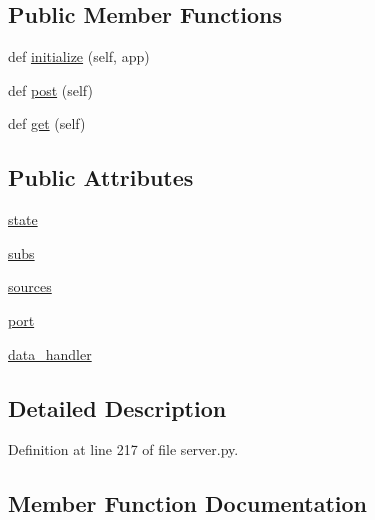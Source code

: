 \subsection*{Public Member Functions}
\begin{DoxyCompactItemize}
\item 
def \hyperlink{classparlai_1_1mturk_1_1webapp_1_1server_1_1RunListHandler_aea5350b7ea1536cacfc3dfff4ffe1f32}{initialize} (self, app)
\item 
def \hyperlink{classparlai_1_1mturk_1_1webapp_1_1server_1_1RunListHandler_a7ecee21fd9a47687af7466e502bba574}{post} (self)
\item 
def \hyperlink{classparlai_1_1mturk_1_1webapp_1_1server_1_1RunListHandler_a66e2a62b37bbcc83c70b25bbbbd64952}{get} (self)
\end{DoxyCompactItemize}
\subsection*{Public Attributes}
\begin{DoxyCompactItemize}
\item 
\hyperlink{classparlai_1_1mturk_1_1webapp_1_1server_1_1RunListHandler_a69b59cd4194adf73ffdc4feae1409df3}{state}
\item 
\hyperlink{classparlai_1_1mturk_1_1webapp_1_1server_1_1RunListHandler_ae6ca04b925262123737c06bb6ce2bc4a}{subs}
\item 
\hyperlink{classparlai_1_1mturk_1_1webapp_1_1server_1_1RunListHandler_a5cc19eca1f894c97d99c01ff02a18e02}{sources}
\item 
\hyperlink{classparlai_1_1mturk_1_1webapp_1_1server_1_1RunListHandler_a31542b109794f0748607b209c07f1a61}{port}
\item 
\hyperlink{classparlai_1_1mturk_1_1webapp_1_1server_1_1RunListHandler_a5084daae3aa6f6de486452498adbc2a1}{data\+\_\+handler}
\end{DoxyCompactItemize}


\subsection{Detailed Description}


Definition at line 217 of file server.\+py.



\subsection{Member Function Documentation}
\mbox{\label{classparlai_1_1mturk_1_1webapp_1_1server_1_1RunListHandler_a66e2a62b37bbcc83c70b25bbbbd64952}} 
